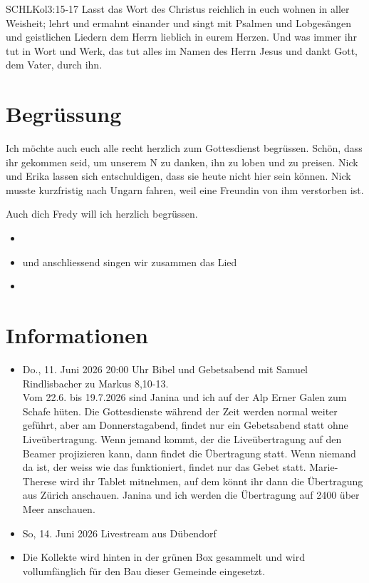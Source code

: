 \documentclass[fontsize=14pt]{../../inc/mybib}
\newcommand{\Name}{Fredy}
\begin{document}
\begin{bibelbox}{SCHL}{Kol}{3:15-17}
    Lasst das Wort des Christus reichlich in euch wohnen in aller Weisheit; lehrt und ermahnt einander und singt mit Psalmen und Lobgesängen und geistlichen Liedern dem Herrn lieblich in eurem Herzen. Und was immer ihr tut in Wort und Werk, das tut alles im Namen des Herrn Jesus und dankt Gott, dem Vater, durch ihn.
\end{bibelbox}
\section{Begrüssung}
Ich möchte auch euch alle recht herzlich zum Gottesdienst begrüssen. Schön, dass ihr gekommen seid, um unserem \herr N zu danken, ihn zu loben und zu preisen. Nick und Erika lassen sich entschuldigen, dass sie heute nicht hier sein können. Nick musste kurzfristig nach Ungarn fahren, weil eine Freundin von ihm verstorben ist. 

Auch dich \Name{} will ich herzlich begrüssen. 
\begin{itemize}
    \item[] 
    \item[] und anschliessend singen wir zusammen das Lied
    \item[] 
\end{itemize}

\section{Informationen}
\begin{itemize}
    \item {} Do., 11. Juni 2026 20:00 Uhr Bibel und Gebetsabend mit Samuel Rindlisbacher zu Markus 8,10-13.\\
    Vom 22.6. bis 19.7.2026 sind Janina und ich auf der Alp Erner Galen zum Schafe hüten. Die Gottesdienste während der Zeit werden normal weiter geführt, aber am Donnerstagabend, findet nur ein Gebetsabend statt ohne Liveübertragung. Wenn jemand kommt, der die Liveübertragung auf den Beamer projizieren kann, dann findet die Übertragung statt. Wenn niemand da ist, der weiss wie das funktioniert, findet nur das Gebet statt. Marie-Therese wird ihr Tablet mitnehmen, auf dem könnt ihr dann die Übertragung aus Zürich anschauen. Janina und ich werden die Übertragung auf 2400 über Meer anschauen.
    \item {} So, 14. Juni 2026 Livestream aus Dübendorf
    \item {} Die Kollekte wird hinten in der grünen Box gesammelt und wird vollumfänglich für den Bau dieser Gemeinde eingesetzt.
\end{itemize}
\end{document}
